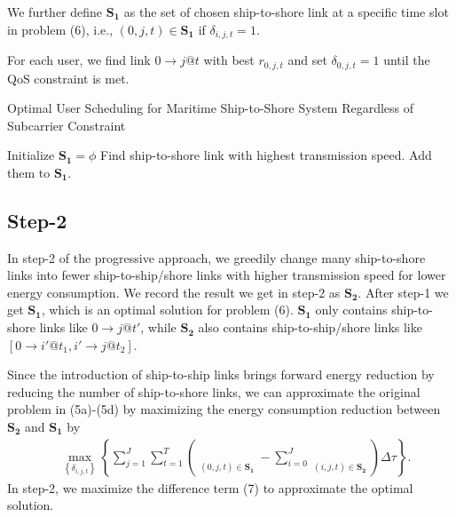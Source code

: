 \documentclass[conference]{IEEEtran}
\begin{document}
 We further define ${{\mathbf{S}}_{\mathbf{1}}}$ as the set of chosen ship-to-shore link at a specific time slot in problem (6), i.e., $\left( {0,j,t} \right) \in {\mathbf{S}}_{\mathbf{1}}$ if ${\delta _{i,j,t} = 1}$. 
 
 For each user, we find link $0 \to j@t$ with best ${r _{0,j,t}}$ and set ${\delta _{0,j,t} = 1}$ until the QoS constraint is met.
 
 \begin{algorithm}[ht]
  \caption{Optimal User Scheduling for Maritime Ship-to-Shore System Regardless of Subcarrier Constraint}
  \label{alg:1}
  \begin{algorithmic}[1]
  \STATE Initialize ${{\mathbf{S}}_{\mathbf{1}}}=\phi$
    \STATE Find ship-to-shore link with highest transmission speed. 
    \STATE Add them to ${{\mathbf{S}}_{\mathbf{1}}}$.
    \ENDWHILE
  \ENDFOR
 \end{algorithmic}
 \end{algorithm}

 \subsection{Step-2}
 
 In step-2 of the progressive approach, we greedily change many ship-to-shore links into fewer ship-to-ship/shore links with higher transmission speed for lower energy consumption. We record the result we get in step-2 as ${{\mathbf{S}}_{\mathbf{2}}}$. After step-1 we get ${{\mathbf{S}}_{\mathbf{1}}}$, which is an optimal solution for problem (6). ${{\mathbf{S}}_{\mathbf{1}}}$ only contains ship-to-shore links like $0 \to j@t'$, while ${{\mathbf{S}}_{\mathbf{2}}}$ also contains ship-to-ship/shore links like $\left[ {0 \to i'@{t_1},i' \to j@{t_2}} \right]$. 
 
 Since the introduction of ship-to-ship links brings forward energy reduction by reducing the number of ship-to-shore links, we can approximate the original problem in (5a)-(5d) by maximizing the energy consumption reduction between ${{\mathbf{S}}_{\mathbf{2}}}$ and ${{\mathbf{S}}_{\mathbf{1}}}$ by 
 \begin{align}
   &\mathop {\max }\limits_{{\left\{ {{\delta _{i,j,t}}} \right\}}} \left\{ {{\sum\limits_{j = 1}^J \sum\limits_{t = 1}^{T}{\left( {\mathop {{P_{0}}\delta _{0,j,t} }\limits_{\left( {0,j,t} \right) \in {{\mathbf{S}}_{\mathbf{1}}}} - \sum\limits_{i = 0}^J {\mathop {{P_{i}}\delta _{i,j,t}}\limits_{\left( {i,j,t} \right) \in {{\mathbf{S}}_{\mathbf{2}}}} } } \right) \Delta \tau } } } \right\}.
 \end{align}
 In step-2, we maximize the difference term (7) to approximate the optimal solution. 
\end{document}
